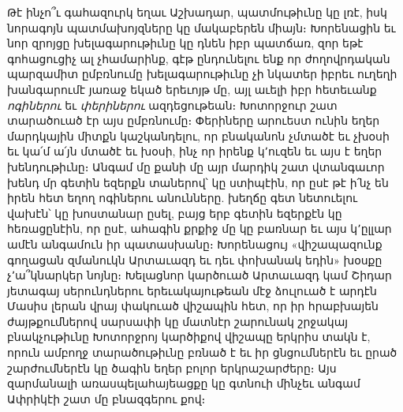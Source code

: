 \documentclass{article}
\begin{document}
{Թէ ինչո՞ւ գահազուրկ եղաւ Աշխադար, պատմութիւնը կը լռէ, իսկ նորագոյն պատմախոյզները կը մակաբերեն միայն։ Խորենացին եւ նոր զրոյցը խելագարութիւնը կը դնեն իբր պատճառ, զոր եթէ գոհացուցիչ ալ չհամարինք, գէթ ընդունելու ենք որ ժողովրդական պարզամիտ ըմբռնումը խելագարութիւնը չի նկատեր իբրեւ ուղեղի խանգարումէ յառաջ եկած երեւոյթ մը, այլ աւելի իբր հետեւանք \emph{ոգիներու} եւ \emph{փերիներու} ազդեցութեան։ Խոտորջուր շատ տարածուած էր այս ըմբռնումը։ Փերիները արուեստ ունին եղեր մարդկային միտքն կաշկանդելու, որ բնականոն չմտածէ եւ չխօսի եւ կա՛մ ա՛յն մտածէ եւ խօսի, ինչ որ իրենք կ՚ուզեն եւ այս է եղեր խենդութիւնը։ Անգամ մը քանի մը այր մարդիկ շատ վտանգաւոր խենդ մր գետին եզերքն տաներով՝ կը ստիպէին, որ ըսէ թէ ի՛նչ են իրեն հետ եղող ոգիներու անունները. խեղճը գետ նետուելու վախէն՝ կը խոստանար ըսել, բայց երբ գետին եզերքէն կը հեռացընէին, որ ըսէ, ահագին քրքիջ մը կը բառնար եւ այս կ՚ըլլար ամէն անգամուն իր պատասխանը։ Խորենացույ «վիշապազունք գողացան զմանուկն Արտաւազդ եւ դեւ փոխանակ եդին» խօսքը չ՚ա՞կնարկեր նոյնը։ Խելացնոր կարծուած Արտաւազդ կամ Շիդար յետագայ սերունդներու երեւակայութեան մէջ ձուլուած է արդէն Մասիս լերան վրայ փակուած վիշապին հետ, որ իր հրաբխայեն ժայթքումներով սարսափի կը մատնէր շարունակ շրջակայ բնակչութիւնը Խոտորջրոյ կարծիքով վիշապը երկրիս տակն է, որուն ամբողջ տարածութիւնը բռնած է եւ իր ցնցումներէն եւ ըրած շարժումներէն կը ծագին եղեր բոլոր երկրաշարժերը։ Այս զարմանալի առասպելահայեացքը կը գտնուի մինչեւ անգամ Ափրիկէի շատ մը բնազգերու քով։

}
\end{document}

